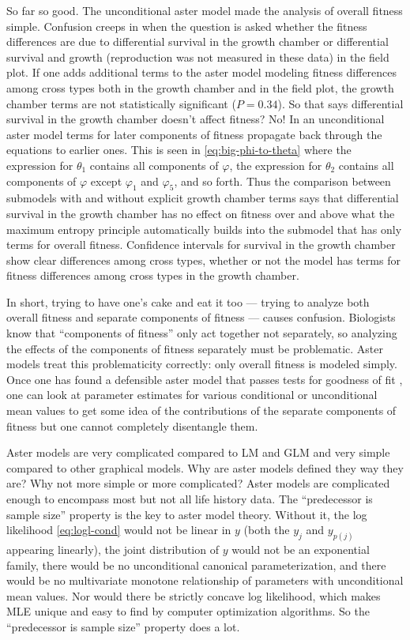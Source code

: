 \documentclass[11pt]{article}
\begin{document}
So far so good.  The unconditional aster model made the analysis of overall
fitness simple.  Confusion creeps in when the question is asked whether the
fitness differences are due to differential survival in the growth chamber
or differential survival and growth (reproduction was not measured in these
data) in the field plot.  If one adds additional terms to the aster model
modeling fitness differences among cross types both in the growth chamber
and in the field plot, the growth chamber terms are not statistically
significant ($P = 0.34$).  So that says differential survival in the growth
chamber doesn't affect fitness?  No!  In an unconditional aster model terms for
later components of fitness propagate back through the equations to earlier
ones.  This is seen in \eqref{eq:big-phi-to-theta} where the expression for
$\theta_1$ contains all components of $\varphi$,
the expression for $\theta_2$ contains all components of $\varphi$
except $\varphi_1$ and $\varphi_5$, and so forth.  Thus the comparison
between submodels with and without explicit growth chamber terms says that
differential survival in the growth chamber has no effect on fitness over
and above what the maximum entropy principle automatically builds into the
submodel that has only terms for overall fitness.  Confidence intervals
for survival in the growth chamber \citep[Figure~2A]{aster2} show clear
differences among cross types, whether or not the model has
terms for fitness differences among cross types in the growth chamber.

In short, trying to have one's cake and eat it too --- trying to analyze
both overall fitness and separate components of fitness --- causes confusion.
Biologists know that ``components of fitness'' only act together not
separately, so analyzing the effects of the components of fitness separately
must be problematic.  Aster models treat this problematicity correctly: only
overall fitness is modeled simply.  Once one has found a defensible aster
model that passes tests for goodness of fit \citep[in Example~2 of][the model
with only terms for overall fitness differences among cross types]{aster2},
one can look at parameter estimates for various conditional or unconditional
mean values to get some idea of the contributions of the separate components
of fitness but one cannot completely disentangle them.

Aster models are very complicated compared to LM and GLM and very simple
compared to other graphical models.  Why are aster models defined they way
they are?  Why not more simple or more complicated?  Aster models are
complicated enough to encompass most but not all life history data.  The
``predecessor is sample size'' property is the key to aster model theory.
Without it, the log likelihood \eqref{eq:logl-cond} would not be linear in
$y$ (both the $y_j$ and $y_{p(j)}$ appearing linearly),
the joint distribution of
$y$ would not be an exponential family, there would be no unconditional
canonical parameterization, and there would be no multivariate monotone
relationship of parameters with unconditional mean values.  Nor would there
be strictly concave log likelihood, which makes MLE unique and easy to find
by computer optimization algorithms.  So the ``predecessor is sample size''
property does a lot.
\end{document}
